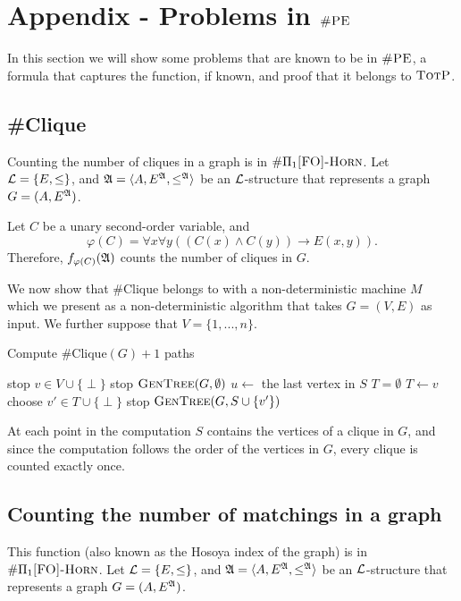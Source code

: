 \section{Appendix - Problems in $\textsc{\#PE}$}

In this section we will show some problems that are known to be in $\textsc{\#PE}$, a formula that captures the function, if known, and proof that it belongs to $\textsc{TotP}$.

\subsection{\#Clique}
Counting the number of cliques in a graph is in $\#\Pi_{1}\textsc{[FO]-Horn}$. Let ${\cal L} = \{E,\leq\}$, and ${\frak A} = \langle A, E^{{\frak A}}, \leq^{{\frak A}} \rangle$ be an ${\cal L}$-structure that represents a graph $G = (A,E^{{\frak A}})$.

Let $C$ be a unary second-order variable, and
\[
\varphi(C) = \forall x \forall y((C(x)\wedge C(y))\to E(x,y)).
\]
Therefore, $f_{\varphi(C)}({\frak A})$ counts the number of cliques in $G$.

We now show that \#Clique belongs to {\totp } with a non-deterministic machine $M$ which we present as a non-deterministic algorithm that takes $G = (V,E)$ as input. We further suppose that $V = \{1,...,n\}$.

	\begin{algorithm}	
		\caption{Compute $\text{\#Clique}(G)+1$ paths}
		\begin{algorithmic}[]
			\Begin
			 stop
			\Else {} $v\in V\cup\{\perp\}$ 
			 stop
			\Else {} $\textsc{GenTree}(G,\emptyset)$
			\EndIf
			\EndIf
			\EndBegin
			\State $u \gets$ the last vertex in $S$
			\State $T = \emptyset$
			\State $T \gets v$
			\EndIf
			\EndFor
			 choose $v'\in T\cup\{\perp\}$
			 stop
			\Else {} $\textsc{GenTree}(G,S\cup\{v'\})$
			\EndIf
			\Else {}
			\EndIf
			\EndProcedure
		\end{algorithmic}
	\end{algorithm}

At each point in the computation $S$ contains the vertices of a clique in $G$, and since the computation follows the order of the vertices in $G$, every clique is counted exactly once.

\subsection{Counting the number of matchings in a graph}
This function (also known as the Hosoya index of the graph) is in $\#\Pi_{1}\textsc{[FO]-Horn}$. Let ${\cal L} = \{E,\leq\}$, and ${\frak A} = \langle A, E^{{\frak A}}, \leq^{{\frak A}} \rangle$ be an ${\cal L}$-structure that represents a graph $G = (A,E^{{\frak A}})$.

